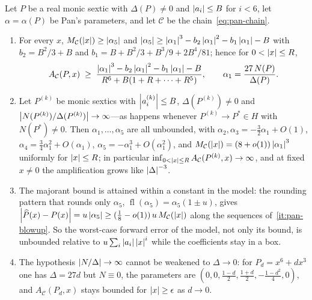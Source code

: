 \begin{proposition}
\label{prop:pan-hypersurface}
Let $P$ be a real monic sextic with $\Delta(P)\ne0$ and $\left\lvert a_i\right\rvert\le B$ for
$i<6$, let $\alpha=\alpha(P)$ be Pan's parameters, and let $\mathcal C$ be the
chain~\eqref{eq:pan-chain}.
\begin{enumerate}[label=(\roman*)]
\item\label{it:pan-lower} For every $x$, $M_{\mathcal C}(\left\lvert x\right\rvert)\ge\left\lvert \alpha_5\right\rvert$ and
  $\left\lvert \alpha_5\right\rvert\ge\left\lvert \alpha_1\right\rvert^3-b_2\left\lvert \alpha_1\right\rvert^2-b_1\left\lvert \alpha_1\right\rvert-B$
  with $b_2=B^2/3+B$ and $b_1=B+B^2/3+B^3/9+2B^4/81$; hence for
  $0<\left\lvert x\right\rvert\le R$,
  \[
    A_{\mathcal C}(P,x)\;\ge\;
    \frac{\left\lvert \alpha_1\right\rvert^3-b_2\left\lvert \alpha_1\right\rvert^2-b_1\left\lvert \alpha_1\right\rvert-B}
         {R^6+B(1+R+\dots+R^5)},\qquad
    \alpha_1=\frac{27\,N(P)}{\Delta(P)} .
  \]
\item\label{it:pan-blowup} Let $P^{(k)}$ be monic sextics with
  $\left\lvert a^{(k)}_i\right\rvert\le B$, $\Delta(P^{(k)})\ne0$ and
  $\left\lvert N(P^{(k)})/\Delta(P^{(k)})\right\rvert\to\infty$---as happens whenever
  $P^{(k)}\to P^*\in H$ with $N(P^*)\ne0$.  Then $\alpha_1,\dots,\alpha_5$
  are all unbounded, with $\alpha_2,\alpha_3=-\tfrac32\alpha_1+O(1)$,
  $\alpha_4=\tfrac34\alpha_1^2+O(\alpha_1)$,
  $\alpha_5=-\alpha_1^3+O(\alpha_1^2)$, and
  $M_{\mathcal C}(\left\lvert x\right\rvert)=(8+o(1))\left\lvert \alpha_1\right\rvert^3$ uniformly for
  $\left\lvert x\right\rvert\le R$; in particular
  $\inf_{0<\left\lvert x\right\rvert\le R}A_{\mathcal C}(P^{(k)},x)\to\infty$, and at fixed
  $x\ne0$ the amplification grows like $\left\lvert \Delta\right\rvert^{-3}$.
\item\label{it:pan-sharp} The majorant bound is attained within a constant
  in the model: the rounding pattern that rounds only $\alpha_5$,
  $\operatorname{fl}(\alpha_5)=\alpha_5(1\pm u)$, gives
  $\left\lvert \widehat P(x)-P(x)\right\rvert=u\left\lvert \alpha_5\right\rvert\ge(\tfrac18-o(1))\,u\,M_{\mathcal C}(\left\lvert x\right\rvert)$
  along the sequences of~\ref{it:pan-blowup}.  So the worst-case forward
  error of the model, not only its bound, is unbounded relative to
  $u\sum_i\left\lvert a_i\right\rvert\left\lvert x\right\rvert^i$ while the coefficients stay in a box.
\item\label{it:pan-necessary} The hypothesis $\left\lvert N/\Delta\right\rvert\to\infty$ cannot
  be weakened to $\Delta\to0$: for $P_d=x^6+dx^3$ one has $\Delta=27d$ but
  $N\equiv0$, the parameters are
  $(0,0,\tfrac{1-d}2,\tfrac{1+d}2,-\tfrac{1-d^2}4,0)$, and
  $A_{\mathcal C}(P_d,x)$ stays bounded for $\left\lvert x\right\rvert\ge\epsilon$ as $d\to0$.
\end{enumerate}
\end{proposition}

